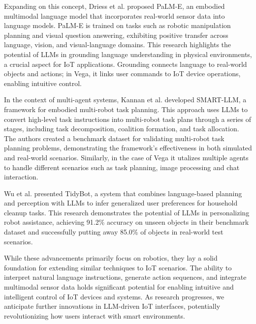 \documentclass{ieeeaccess}
\begin{document}
Expanding on this concept, Driess et al. \cite{10.5555/3618408.3618748} proposed PaLM-E, an embodied multimodal language model that incorporates real-world sensor data into language models. PaLM-E is trained on tasks such as robotic manipulation planning and visual question answering, exhibiting positive transfer across language, vision, and visual-language domains. This research highlights the potential of LLMs in grounding language understanding in physical environments, a crucial aspect for IoT applications. Grounding connects language to real-world objects and actions; in Vega, it links user commands to IoT device operations, enabling intuitive control.

In the context of multi-agent systems, Kannan et al. \cite{kannan2024smartllmsmartmultiagentrobot} developed SMART-LLM, a framework for embodied multi-robot task planning. This approach uses LLMs to convert high-level task instructions into multi-robot task plans through a series of stages, including task decomposition, coalition formation, and task allocation. The authors created a benchmark dataset for validating multi-robot task planning problems, demonstrating the framework's effectiveness in both simulated and real-world scenarios. Similarly, in the case of Vega it utalizes multiple agents to handle different scenarios such as task planning, image processing and chat interaction.

Wu et al. \cite{Wu2023} presented TidyBot, a system that combines language-based planning and perception with LLMs to infer generalized user preferences for household cleanup tasks. This research demonstrates the potential of LLMs in personalizing robot assistance, achieving 91.2\% accuracy on unseen objects in their benchmark dataset and successfully putting away 85.0\% of objects in real-world test scenarios.

While these advancements primarily focus on robotics, they lay a solid foundation for extending similar techniques to IoT scenarios. The ability to interpret natural language instructions, generate action sequences, and integrate multimodal sensor data holds significant potential for enabling intuitive and intelligent control of IoT devices and systems. As research progresses, we anticipate further innovations in LLM-driven IoT interfaces, potentially revolutionizing how users interact with smart environments.
\end{document}
